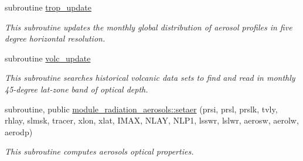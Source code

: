 \begin{DoxyCompactItemize}
\mbox{\label{group__module__radiation__aerosols_gafac9a9c603c033c8511e8dbfe984f703}} 
subroutine \hyperlink{group__module__radiation__aerosols_gafac9a9c603c033c8511e8dbfe984f703}{trop\+\_\+update}
\begin{DoxyCompactList}\small\item\em This subroutine updates the monthly global distribution of aerosol profiles in five degree horizontal resolution. \end{DoxyCompactList}\item 
\mbox{\label{group__module__radiation__aerosols_ga6ec9bd68d45a5f2c6bb9997bdad420c3}} 
subroutine \hyperlink{group__module__radiation__aerosols_ga6ec9bd68d45a5f2c6bb9997bdad420c3}{volc\+\_\+update}
\begin{DoxyCompactList}\small\item\em This subroutine searches historical volcanic data sets to find and read in monthly 45-\/degree lat-\/zone band of optical depth. \end{DoxyCompactList}\item 
subroutine, public \hyperlink{group__module__radiation__aerosols_ga184fcc0618c1c4d42fa08cfe1e20e5c1}{module\+\_\+radiation\+\_\+aerosols\+::setaer} (prsi, prsl, prslk, tvly, rhlay, slmsk, tracer, xlon, xlat, I\+M\+AX, N\+L\+AY, N\+L\+P1, lsswr, lslwr, aerosw, aerolw, aerodp)
\begin{DoxyCompactList}\small\item\em This subroutine computes aerosols optical properties. \end{DoxyCompactList}\end{DoxyCompactItemize}
